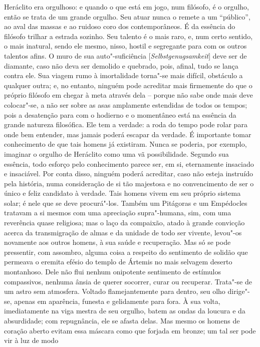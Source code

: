 Heráclito era orgulhoso: e quando o que está em jogo, num filósofo, é o
orgulho, então se trata de um grande orgulho. Seu atuar nunca o remete a
um ``público'', ao aval das massas e ao ruidoso coro dos contemporâneos.
É da essência do filósofo trilhar a estrada sozinho. Seu talento é o
mais raro, e, num certo sentido, o mais inatural, sendo ele mesmo,
nisso, hostil e segregante para com os outros talentos afins. O muro de
sua auto"-suficiência [\textit{Selbstgenugsamkeit}] deve ser de
diamante, caso não deva ser demolido e quebrado, pois, afinal, tudo
se lança contra ele. Sua viagem rumo à imortalidade torna"-se mais difícil,
obstáculo a qualquer outra; e, no entanto, ninguém pode acreditar
mais firmemente do que o próprio filósofo em chegar à meta através dela
-- porque não sabe onde mais deve colocar"-se, a não ser sobre as asas
amplamente estendidas de todos os tempos; pois a desatenção para com o
hodierno e o momentâneo está na essência da grande natureza filosófica.
Ele tem a verdade: a roda do tempo pode rolar para onde bem entender,
mas jamais poderá escapar da verdade. É importante tomar conhecimento
de que tais homens já existiram. Nunca se poderia, por exemplo,
imaginar o orgulho de Heráclito como uma vã possibilidade. Segundo sua
essência, todo esforço pelo conhecimento parece ser, em si, eternamente
insaciado e insaciável. Por conta disso, ninguém poderá acreditar, caso
não esteja instruído pela história, numa consideração de si tão
majestosa e no convencimento de ser o único e feliz candidato à
verdade. Tais homens vivem em seu próprio sistema solar; é nele que se
deve procurá"-los. Também um Pitágoras e um Empédocles tratavam a si
mesmos com uma apreciação supra"-humana, sim, com uma reverência
quase religiosa; mas o laço da compaixão, atado à grande convicção
acerca da transmigração de almas e da unidade de todo ser vivente,
levou"-os novamente aos outros homens, à sua saúde e recuperação. Mas só
se pode pressentir, com assombro, alguma coisa a respeito do sentimento
de solidão que permeava o eremita efésio do templo de Ártemis no mais
selvagem deserto montanhoso. Dele não flui nenhum onipotente sentimento
de estímulos compassivos, nenhuma ânsia de querer socorrer, curar ou
recuperar. Trata"-se de um astro sem atmosfera. Voltado flamejantemente
para dentro, seu olho dirige"-se, apenas em aparência, funesta e
gelidamente para fora. À sua volta, imediatamente na viga mestra de seu
orgulho, batem as ondas da loucura e da absurdidade; com repugnância,
ele se afasta delas. Mas mesmo os homens de coração aberto evitam essa
máscara como que forjada em bronze; um tal ser pode vir à luz de modo
